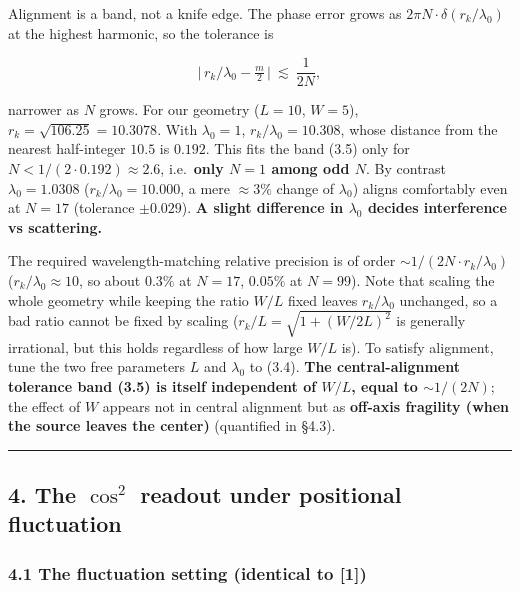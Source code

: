 \documentclass[
]{article}
\begin{document}
Alignment is a band, not a knife edge. The phase error grows as
\(2\pi N\cdot\delta(r_k/\lambda_0)\) at the highest harmonic, so the
tolerance is

\[
\big|\,r_k/\lambda_0-\tfrac{m}{2}\,\big|\ \lesssim\ \frac{1}{2N},
\tag{3.5}
\]

narrower as \(N\) grows. For our geometry (\(L=10\), \(W=5\)),
\(r_k=\sqrt{106.25}=10.3078\). With \(\lambda_0=1\),
\(r_k/\lambda_0=10.308\), whose distance from the nearest half-integer
\(10.5\) is \(0.192\). This fits the band (3.5) only for
\(N<1/(2\cdot0.192)\approx2.6\), i.e.~\textbf{only \(N=1\) among odd
\(N\)}. By contrast \(\lambda_0=1.0308\) (\(r_k/\lambda_0=10.000\), a
mere \(\approx3\%\) change of \(\lambda_0\)) aligns comfortably even at
\(N=17\) (tolerance \(\pm0.029\)). \textbf{A slight difference in
\(\lambda_0\) decides interference vs scattering.}

The required wavelength-matching relative precision is of order
\(\sim 1/(2N\cdot r_k/\lambda_0)\) (\(r_k/\lambda_0\approx10\), so about
\(0.3\%\) at \(N=17\), \(0.05\%\) at \(N=99\)). Note that scaling the
whole geometry while keeping the ratio \(W/L\) fixed leaves
\(r_k/\lambda_0\) unchanged, so a bad ratio cannot be fixed by scaling
(\(r_k/L=\sqrt{1+(W/2L)^2}\) is generally irrational, but this holds
regardless of how large \(W/L\) is). To satisfy alignment, tune the two
free parameters \(L\) and \(\lambda_0\) to (3.4). \textbf{The
central-alignment tolerance band (3.5) is itself independent of \(W/L\),
equal to \(\sim1/(2N)\)}; the effect of \(W\) appears not in central
alignment but as \textbf{off-axis fragility (when the source leaves the
center)} (quantified in §4.3).

\begin{center}\rule{0.5\linewidth}{0.5pt}\end{center}

\subsection{\texorpdfstring{4. The \(\cos^2\) readout under positional
fluctuation}{4. The \textbackslash cos\^{}2 readout under positional fluctuation}}\label{the-cos2-readout-under-positional-fluctuation}

\subsubsection{4.1 The fluctuation setting (identical to
{[}1{]})}\label{the-fluctuation-setting-identical-to-1}
\end{document}
